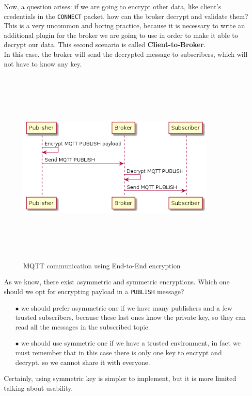 \documentclass[12pt]{report}
\begin{document}
{Now, a question arises: if we are going to encrypt other data, like client's credentials in the \texttt{CONNECT} packet, how can the broker decrypt and validate them?
This is a very uncommon and boring practice, because it is necessary to write an additional plugin for the broker we are going to use in order to make it able to decrypt our data. 
This second scenario is called \textbf{Client-to-Broker}.\\
In this case, the broker will send the decrypted message to subscribers, which will not have to know any key.

\begin{figure}[H]
\includegraphics[width=10cm,height=10cm,keepaspectratio]{client_to_broker}
\centering
\caption{MQTT communication using End-to-End encryption}
\end{figure}

As we know, there exist asymmetric and symmetric encryptions. Which one should we opt for encrypting payload in a \texttt{PUBLISH} message?

\begin{itemize}
\setlength{\itemindent}{+4mm}
  \item[$\bullet$] we should prefer asymmetric one if we have many publishers and a few trusted subscribers, because these last ones know the private key, so they can read all the messages in the subscribed topic
  \item[$\bullet$] we should use symmetric one if we have a trusted environment, in fact we must remember that in this case there is only one key to encrypt and decrypt, so we cannot share it with everyone.
\end{itemize}
\bigskip
Certainly, using symmetric key is simpler to implement, but it is more limited talking about usability.

}
\end{document}
